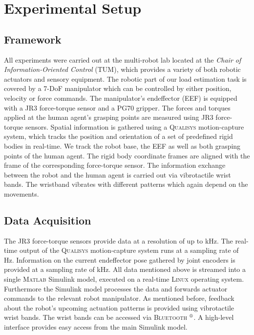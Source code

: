 \section{Experimental Setup}

\subsection{Framework}
All experiments were carried out at the multi-robot lab located at the \textit{Chair of Information-Oriented Control} (TUM), which provides a variety of both robotic actuators and sensory equipment. The robotic part of our load estimation task is covered by a 7-DoF manipulator which can be controlled by either position, velocity or force commands. The manipulator's endeffector (EEF) is equipped with a \textsc{JR3} force-torque sensor and a \textsc{PG70} gripper. The forces and torques applied at the human agent's grasping points are measured using \textsc{JR3} force-torque sensors. Spatial information is gathered using a \textsc{Qualisys} motion-capture system, which tracks the position and orientation of a set of predefined rigid bodies in real-time. We track the robot base, the EEF as well as both grasping points of the human agent. The rigid body coordinate frames are aligned with the frame of the corresponding force-torque sensor. The information exchange between the robot and the human agent is carried out via vibrotactile wrist bands. The wristband vibrates with different patterns which again depend on the movements.

\subsection{Data Acquisition}
The \textsc{JR3} force-torque sensors provide data at a resolution of up to \unit[8]{kHz}. The real-time output of the \textsc{Qualisys} motion-capture system runs at a sampling rate of \unit[150]{Hz}. Information on the current endeffector pose gathered by joint encoders is provided at a sampling rate of \unit[1]{kHz}. All data mentioned above is streamed into a single \textsc{Matlab} Simulink model, executed on a real-time \textsc{Linux} operating system. Furthermore the Simulink model processes the data and forwards actuator commands to the relevant robot manipulator.
As mentioned before, feedback about the robot's upcoming actuation patterns is provided using vibrotactile wrist bands. The wrist bands can be accessed via \textsc{Bluetooth $^\text{\textregistered}$}. A high-level interface provides easy access from the main Simulink model.


